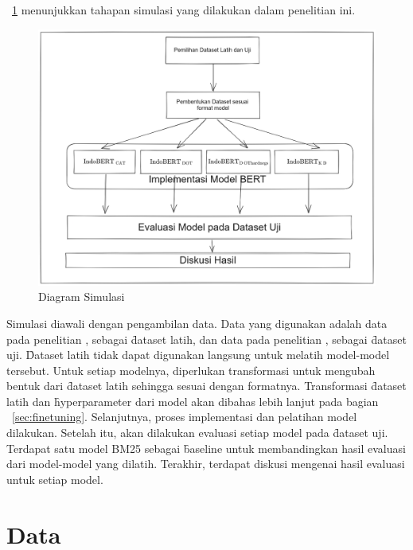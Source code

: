 \pic~\ref{fig:diagram-simulasi} menunjukkan tahapan simulasi yang dilakukan dalam penelitian ini.
\begin{figure}
    \centering
    \includegraphics[width=1\textwidth]{assets/pics/alursimulasi.png}
    \caption{Diagram Simulasi}
    \label{fig:diagram-simulasi}

\end{figure}

Simulasi diawali dengan pengambilan data. Data yang digunakan adalah data pada penelitian \cite{mmarco}, sebagai \f{dataset} latih, dan data pada penelitian \cite{mrtydi}, \cite{miracl} sebagai \f{dataset} uji. \f{Dataset} latih tidak dapat digunakan langsung untuk melatih model-model tersebut. Untuk setiap modelnya, diperlukan transformasi untuk mengubah bentuk dari \f{dataset} latih sehingga sesuai dengan formatnya. Transformasi \f{dataset} latih dan \f{hyperparameter} dari model akan dibahas lebih lanjut pada bagian \sect~\ref{sec:finetuning}. Selanjutnya, proses implementasi dan pelatihan model dilakukan. Setelah itu, akan dilakukan evaluasi setiap model pada \f{dataset} uji. Terdapat satu model BM25 sebagai \f{baseline} untuk membandingkan hasil evaluasi dari model-model yang dilatih. Terakhir, terdapat diskusi mengenai hasil evaluasi untuk setiap model.

\section{Data}
\label{sec:dataset}

